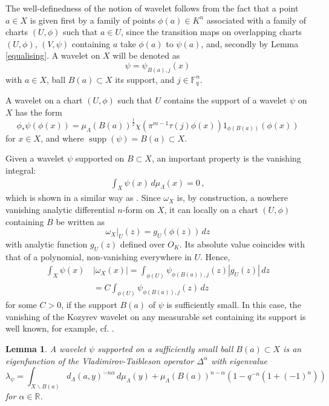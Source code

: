 \documentclass[a4paper,draft]{ZbRad}
\theoremstyle{plain}
\newtheorem{lem}{Lemma}[section]
\theoremstyle{definition}
\numberwithin{equation}{section}
\renewcommand{\setminus}{\smallsetminus}
\newcommand{\absolute}[1]{\left\lvert#1\right\rvert}
\DeclareMathOperator{\supp}{supp}
\begin{document}
The well-definedness of the notion of wavelet follows from the fact that a point $a\in X$ is given first
by a family of points $\phi(a)\in K^n$ associated with a family of charts $(U,\phi)$ such
that $a\in U$, since the transition maps on overlapping charts $(U,\phi)$, $(V,\psi)$
containing $a$ take $\phi(a)$ to $\psi(a)$, and, secondly by Lemma \ref{equalising}. 
A wavelet on $X$ will be denoted as
\[
\psi=\psi_{B(a),j}(x)
\]
with $a\in X$, ball $B(a)\subset X$ its support, and $j\in\mathbb{F}_q^n$.
\newline

A wavelet on a chart $(U,\phi)$ such that $U$ contains the support of
a wavelet $\psi$ on $X$ has the form
\[
\phi_{*}\psi(\phi(x)) 
= \mu_\Lambda (B(a))^{\frac12}
\chi\left(\pi^{m-1}\tau(j)\phi(x)\right)
1_{\phi(B(a))} (\phi(x))
\]
for $x\in X$, and where $\supp(\psi)=B(a)\subset X$.
\newline

Given a wavelet $\psi$ supported  on $B\subset X$, an important property is the vanishing integral:
\begin{align}\label{vanishingInt}
\int_X\psi(x)\,d\mu_\Lambda(x)=0\,,
\end{align}
which is shown in a similar way as 
\cite[Lemma 2.15]{hearGenusMumf}.
Since $\omega_X$ is, by construction, a nowhere vanishing analytic differential
$n$-form on $X$, it can locally on a chart $(U, \phi)$ containing $B$ be written  as
\[
\omega_X|_{U} (z)= g_U (\phi(z))\, dz
\]
with analytic function $g_U(z)$ defined over $O_K$. Its absolute value coincides
with that of a polynomial, non-vanishing everywhere in $U$. Hence,
\begin{align*}
\int_X\psi(x)\,&\absolute{\omega_X(x)}
=
\int_{\phi(U)}\psi_{\phi(B(a)),j}(z)\absolute{g_U(z)}\,dz
\\
&=C\int_{\phi(U)}\psi_{\phi(B(a)),j}(z)\,dz
\end{align*}
for some $C>0$, if the support $B(a)$ of $\psi$ is sufficiently small. In this case, the vanishing of the Kozyrev wavelet on any measurable
set containing its support is well known, for example, cf. 
\cite[Theorem 2.3.9]{XKZ2018}.


\begin{lem}\label{waveletSpec}
A wavelet $\psi$ supported on a sufficiently small ball $B(a)\subset X$ is an eigenfunction of the Vladimirov-Taibleson operator
 $\Delta^\alpha$ with eigenvalue
\[
\lambda_\psi=\int_{X\setminus B(a)}d_\Lambda(a,y)^{-n\alpha}\,d\mu_\Lambda(y)
+\mu_\Lambda(B(a))^{n-\alpha}
(1-q^{-n}(1+(-1)^n))
\]
for $\alpha\in\mathbb{R}$.
\end{lem}
\end{document}
